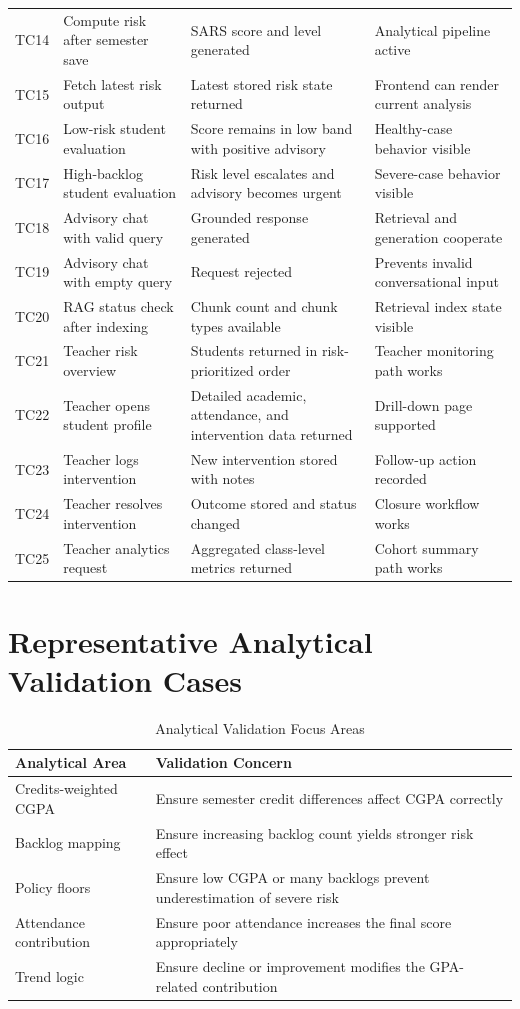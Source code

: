 \begin{longtable}{p{}p{}p{}p{}}
TC14 & Compute risk after semester save & SARS score and level generated & Analytical pipeline active \\
TC15 & Fetch latest risk output & Latest stored risk state returned & Frontend can render current analysis \\
TC16 & Low-risk student evaluation & Score remains in low band with positive advisory & Healthy-case behavior visible \\
TC17 & High-backlog student evaluation & Risk level escalates and advisory becomes urgent & Severe-case behavior visible \\
TC18 & Advisory chat with valid query & Grounded response generated & Retrieval and generation cooperate \\
TC19 & Advisory chat with empty query & Request rejected & Prevents invalid conversational input \\
TC20 & RAG status check after indexing & Chunk count and chunk types available & Retrieval index state visible \\
TC21 & Teacher risk overview & Students returned in risk-prioritized order & Teacher monitoring path works \\
TC22 & Teacher opens student profile & Detailed academic, attendance, and intervention data returned & Drill-down page supported \\
TC23 & Teacher logs intervention & New intervention stored with notes & Follow-up action recorded \\
TC24 & Teacher resolves intervention & Outcome stored and status changed & Closure workflow works \\
TC25 & Teacher analytics request & Aggregated class-level metrics returned & Cohort summary path works \\
\bottomrule
\end{longtable}

\section{Representative Analytical Validation Cases}
\begin{table}[H]
\centering
\caption{Analytical Validation Focus Areas}
\begin{tabularx}{\textwidth}{>{\raggedright\arraybackslash}p{} >{\raggedright\arraybackslash}X}
\toprule
\textbf{Analytical Area} & \textbf{Validation Concern} \\
\midrule
Credits-weighted CGPA & Ensure semester credit differences affect CGPA correctly \\
Backlog mapping & Ensure increasing backlog count yields stronger risk effect \\
Policy floors & Ensure low CGPA or many backlogs prevent underestimation of severe risk \\
Attendance contribution & Ensure poor attendance increases the final score appropriately \\
Trend logic & Ensure decline or improvement modifies the GPA-related contribution \\
\bottomrule
\end{tabularx}
\end{table}

